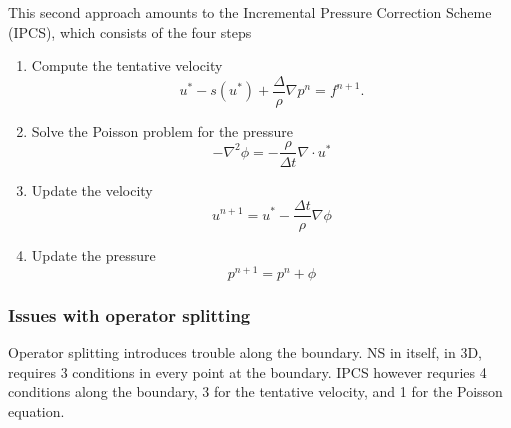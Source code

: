 This second approach amounts to the Incremental Pressure Correction Scheme (IPCS), which consists of the four steps
\begin{enumerate}
    \item Compute the tentative velocity
        \begin{equation}
            u^* - s(u^*) + \frac{\Delta}{\rho}\nabla p^n = f^{n + 1}.
        \end{equation}

    \item Solve the Poisson problem for the pressure
        \begin{equation}
            -\nabla^2 \phi = - \frac{\rho}{\Delta t} \nabla \cdot u^*
        \end{equation}

    \item Update the velocity
        \begin{equation}
            u^{n + 1} = u^* - \frac{\Delta t}{\rho} \nabla \phi
        \end{equation}

    \item Update the pressure
        \begin{equation}
            p^{n + 1} = p^n + \phi
        \end{equation}
\end{enumerate}

\subsubsection{Issues with operator splitting}
Operator splitting introduces trouble along the boundary.
NS in itself, in 3D, requires 3 conditions in every point at the boundary.
IPCS however requries 4 conditions along the boundary, 3 for the tentative velocity, and 1 for the Poisson equation.

